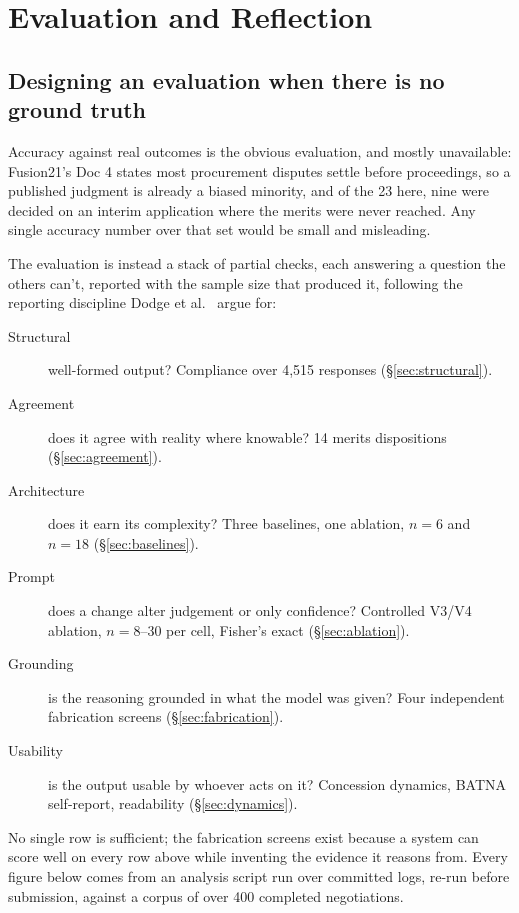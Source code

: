 \chapter{Evaluation and Reflection}
\label{ch:evaluation}

\section{Designing an evaluation when there is no ground truth}
\label{sec:eval-design}

Accuracy against real outcomes is the obvious evaluation, and mostly
unavailable: Fusion21's Doc 4 states most procurement disputes settle before
proceedings, so a published judgment is already a biased minority, and of
the 23 here, nine were decided on an interim application where the merits
were never reached. Any single accuracy number over that set would be small
and misleading.

The evaluation is instead a stack of partial checks, each answering a
question the others can't, reported with the sample size that produced it,
following the reporting discipline Dodge et al.\
\cite{dodge2019showyourwork} argue for:

\begin{description}
 \item[Structural] well-formed output? Compliance over 4{,}515 responses
 (\S\ref{sec:structural}).
 \item[Agreement] does it agree with reality where knowable? 14 merits
 dispositions (\S\ref{sec:agreement}).
 \item[Architecture] does it earn its complexity? Three baselines, one
 ablation, $n=6$ and $n=18$ (\S\ref{sec:baselines}).
 \item[Prompt] does a change alter judgement or only confidence? Controlled
 V3/V4 ablation, $n=8$--30 per cell, Fisher's exact (\S\ref{sec:ablation}).
 \item[Grounding] is the reasoning grounded in what the model was given?
 Four independent fabrication screens (\S\ref{sec:fabrication}).
 \item[Usability] is the output usable by whoever acts on it? Concession
 dynamics, BATNA self-report, readability (\S\ref{sec:dynamics}).
\end{description}

No single row is sufficient; the fabrication screens exist because a system
can score well on every row above while inventing the evidence it reasons
from. Every figure below comes from an analysis script run over committed
logs, re-run before submission, against a corpus of over 400 completed
negotiations.

